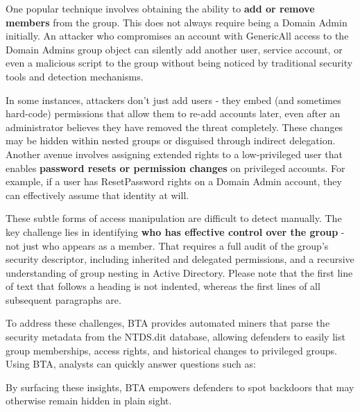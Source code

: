 One popular technique involves obtaining the ability to \textbf{add or remove members} from the group. This does not always require being a Domain Admin initially. An attacker who compromises an account with GenericAll access to the Domain Admins group object can silently add another user, service account, or even a malicious script to the group without being noticed by traditional security tools and detection mechanisms.

In some instances, attackers don't just add users - they embed (and sometimes hard-code) permissions that allow them to re-add accounts later, even after an administrator believes they have removed the threat completely. These changes may be hidden within nested groups or disguised through indirect delegation.
Another avenue involves assigning extended rights to a low-privileged user that enables \textbf{password resets or permission changes} on privileged accounts. For example, if a user has ResetPassword rights on a Domain Admin account, they can effectively assume that identity at will.

These subtle forms of access manipulation are difficult to detect manually. The key challenge lies in identifying \textbf{who has effective control over the group} - not just who appears as a member. That requires a full audit of the group's security descriptor, including inherited and delegated permissions, and a recursive understanding of group nesting in Active Directory.
Please note that the first line of text that follows a heading is not indented, whereas the first lines of all subsequent paragraphs are.

To address these challenges, BTA provides automated miners that parse the security metadata from the NTDS.dit database, allowing defenders to easily list group memberships, access rights, and historical changes to privileged groups. Using BTA, analysts can quickly answer questions such as:

By surfacing these insights, BTA empowers defenders to spot backdoors that may otherwise remain hidden in plain sight. 
